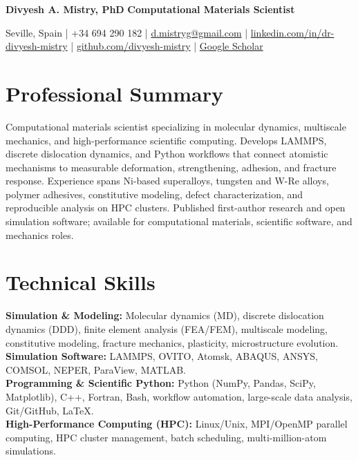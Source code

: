 \documentclass[10pt,a4paper]{article}
\begin{document}
{\LARGE\bfseries\color{navy} Divyesh A. Mistry, PhD}\hfill
{\large\bfseries Computational Materials Scientist}\par
\vspace{3pt}
Seville, Spain \;|\; +34 694 290 182 \;|\;
\href{mailto:d.mistryg@gmail.com}{d.mistryg@gmail.com} \;|\;
\href{https://www.linkedin.com/in/dr-divyesh-mistry-7b40a95b/}{linkedin.com/in/dr-divyesh-mistry} \;|\;
\href{https://github.com/divyesh-mistry}{github.com/divyesh-mistry} \;|\;
\href{https://scholar.google.com/citations?user=feQuDO8AAAAJ\&hl=en}{Google Scholar}

\section{Professional Summary}
Computational materials scientist specializing in molecular dynamics, multiscale mechanics, and high-performance scientific computing. Develops LAMMPS, discrete dislocation dynamics, and Python workflows that connect atomistic mechanisms to measurable deformation, strengthening, adhesion, and fracture response. Experience spans Ni-based superalloys, tungsten and W-Re alloys, polymer adhesives, constitutive modeling, defect characterization, and reproducible analysis on HPC clusters. Published first-author research and open simulation software; available for computational materials, scientific software, and mechanics roles.

\section{Technical Skills}
\textbf{Simulation \& Modeling:} Molecular dynamics (MD), discrete dislocation dynamics (DDD), finite element analysis (FEA/FEM), multiscale modeling, constitutive modeling, fracture mechanics, plasticity, microstructure evolution.\\[2pt]
\textbf{Simulation Software:} LAMMPS, OVITO, Atomsk, ABAQUS, ANSYS, COMSOL, NEPER, ParaView, MATLAB.\\[2pt]
\textbf{Programming \& Scientific Python:} Python (NumPy, Pandas, SciPy, Matplotlib), C++, Fortran, Bash, workflow automation, large-scale data analysis, Git/GitHub, \LaTeX.\\[2pt]
\textbf{High-Performance Computing (HPC):} Linux/Unix, MPI/OpenMP parallel computing, HPC cluster management, batch scheduling, multi-million-atom simulations.
\end{document}
